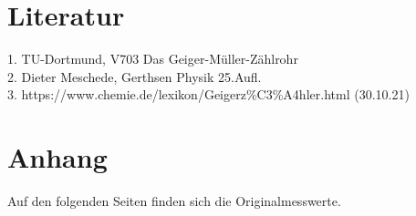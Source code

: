\section{Literatur}
\label{sec:literatur}
1. TU-Dortmund, V703 Das Geiger-Müller-Zählrohr\\
2. Dieter Meschede, Gerthsen Physik 25.Aufl.\\
3. https://www.chemie.de/lexikon/Geigerz\%C3\%A4hler.html (30.10.21)

\section{Anhang}
\label{sec:anhang}
Auf den folgenden Seiten finden sich die Originalmesswerte.
